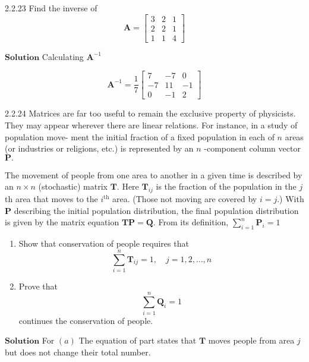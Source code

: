 \documentclass{article}
\begin{document}
\begin{flushleft}
\begin{mybox}{2.2.23}
Find the inverse of
$$
\mathbf{A}=\begin{bmatrix}{3} & {2} & {1} \\ {2} & {2} & {1} \\ {1} & {1} & {4}\end{bmatrix}
$$
\end{mybox}


$\boxed{\textbf{Solution}}$ Calculating $\mathbf{A}^{-1}$


$$\mathbf{A}^{-1}=\frac{1}{7}\begin{bmatrix}{7} & {-7} & {0} \\ {-7} & {11} & {-1} \\ {0} & {-1} & {2}\end{bmatrix}$$


\begin{mybox}{2.2.24}
Matrices are far too useful to remain the exclusive property of physicists. They may
appear wherever there are linear relations. For instance, in a study of population move-
ment the initial fraction of a fixed population in each of $n$ areas (or industries or
religions, etc.) is represented by an $n$ -component column vector $\mathbf{P} .$ 

The movement of people from one area to another in a given time is described by an $n \times n$ (stochastic) matrix $\mathbf{T}$. Here $\mathbf{T}_{i j}$ is the fraction of the population in the $j$ th area that moves to the $i^{\text{th}}$ area. (Those not moving are covered by $i=j.$) With $\mathbf{P}$ describing the initial population distribution, the final population distribution is given by the matrix equation $\mathbf{TP}=\mathbf{Q}$. From its definition, $\sum_{i=1}^{n} \mathbf{P}_{i}=1$

\begin{enumerate}[$(a)$]
\item Show that conservation of people requires that
$$
\sum_{i=1}^{n} \mathbf{T}_{i j}=1, \quad j=1,2, \ldots, n
$$
\item Prove that
$$
\sum_{i=1}^{n} \mathbf{Q}_{i}=1
$$
continues the conservation of people.
\end{enumerate}
\end{mybox}




$\boxed{\textbf{Solution}}$  For $(a)$ The equation of part states that $\mathbf{T}$ moves people from area $j$ but
does not change their total number. 




\end{flushleft}
\end{document}
